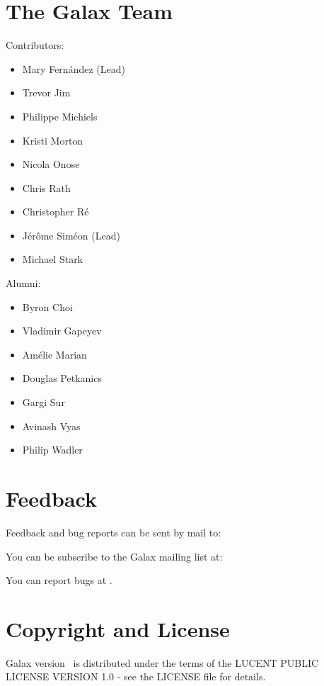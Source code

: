 \section{The Galax Team}

Contributors:

\begin{itemize}
\item Mary Fern\'andez (Lead)
\item Trevor Jim
\item Philippe Michiels
\item Kristi Morton
\item Nicola Onose
\item Chris Rath
\item Christopher R\'e
\item J\'er\^ome Sim\'eon (Lead)
\item Michael Stark
\end{itemize}

Alumni:

\begin{itemize}
\item Byron Choi
\item Vladimir Gapeyev
\item Am\'elie Marian
\item Douglas Petkanics
\item Gargi Sur
\item Avinash Vyas
\item Philip Wadler
\end{itemize}

\section{Feedback}

Feedback and bug reports can be sent by mail to:
{\galaxusers}

You can be subscribe to the Galax mailing list at:
{\galaxrequestusers}

You can report bugs at {\bugzillaurl}.

\section{Copyright and License}
\label{sec:license}

Galax version \galaxversion\ is distributed under the terms of the
LUCENT PUBLIC LICENSE VERSION 1.0 - see the LICENSE file for details.

\begin{alltt}

\end{alltt}

